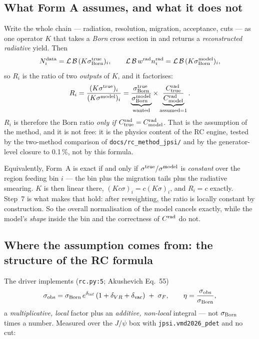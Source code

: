 \documentclass[11pt]{article}
\newcommand{\crad}{C^{\rm rad}}
\newcommand{\Lum}{\mathcal{L}}
\newcommand{\BR}{\mathcal{B}}
\begin{document}
\subsection*{What Form A assumes, and what it does not}

Write the whole chain --- radiation, resolution, migration, acceptance, cuts --- as one operator $K$
that takes a \emph{Born} cross section in and returns a \emph{reconstructed radiative} yield. Then
\begin{equation}
N_i^{\rm data}=\Lum\,\BR\,(K\sigma^{\rm true}_{\rm Born})_i,
\qquad
\Lum\,\BR\,w^{\rm rad}n_i^{\rm rad}=\Lum\,\BR\,(K\sigma^{\rm model}_{\rm Born})_i,
\end{equation}
so $R_i$ is the ratio of two \emph{outputs} of $K$, and it factorises:
\begin{equation}
R_i=\frac{(K\sigma^{\rm true})_i}{(K\sigma^{\rm model})_i}
=\underbrace{\frac{\sigma^{\rm true}_{\rm Born}}{\sigma^{\rm model}_{\rm Born}}}_{\text{wanted}}
\times
\underbrace{\frac{C^{\rm rad}_{\rm true}}{C^{\rm rad}_{\rm model}}}_{\text{assumed}=1}.
\label{eq:assumption}
\end{equation}
$R_i$ is therefore the Born ratio \emph{only if} $C^{\rm rad}_{\rm true}=C^{\rm rad}_{\rm model}$.
That is the assumption of the method, and it is not free: it is the physics content of the RC engine,
tested by the two-method comparison of \texttt{docs/rc\_method\_jpsi/} and by the generator-level
closure to 0.1\,\%, not by this formula.

Equivalently, Form~A is exact if and only if $\sigma^{\rm true}/\sigma^{\rm model}$ is
\emph{constant} over the region feeding bin $i$ --- the bin plus the migration tails plus the
radiative smearing. $K$ is then linear there, $(Kc\sigma)_i=c(K\sigma)_i$, and $R_i=c$ exactly.
Step~7 is what makes that hold: after reweighting, the ratio is locally constant by construction.
So the overall normalisation of the model cancels exactly, while the model's \emph{shape} inside the
bin and the correctness of $\crad$ do not.

\subsection*{Where the assumption comes from: the structure of the RC formula}

The driver implements (\texttt{rc.py:5}; Akushevich Eq.~55)
\begin{equation}
\sigma_{\rm obs}=\sigma_{\rm Born}\,e^{\delta_{\rm inf}}\,(1+\delta_{VR}+\delta_{\rm vac})
\;+\;\sigma_F,
\qquad \eta=\frac{\sigma_{\rm obs}}{\sigma_{\rm Born}},
\label{eq:eq55}
\end{equation}
a \emph{multiplicative, local} factor plus an \emph{additive, non-local} integral --- not
$\sigma_{\rm Born}$ times a number. Measured over the $J/\psi$ box with
\texttt{jpsi.vmd2026\_pdet} and no cut:
\end{document}
